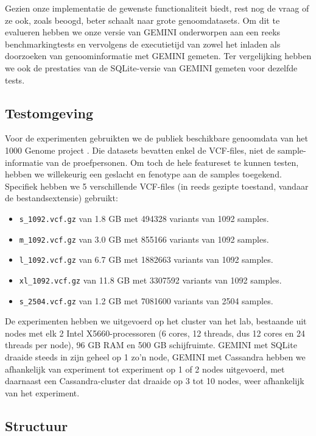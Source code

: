 Gezien onze implementatie de gewenste functionaliteit biedt, rest nog de vraag of ze ook, zoals beoogd, beter schaalt naar grote genoomdatasets. Om dit te evalueren hebben we onze versie van GEMINI onderworpen aan een reeks benchmarkingtests en vervolgens de executietijd van zowel het inladen als doorzoeken van genoominformatie met GEMINI gemeten. Ter vergelijking hebben we ook de prestaties van de SQLite-versie van GEMINI gemeten voor dezelfde tests.

\subsection{Testomgeving}

Voor de experimenten gebruikten we de publiek beschikbare genoomdata van het 1000 Genome project \cite{10002012integrated}. Die datasets bevatten enkel de VCF-files, niet de sample-informatie van de proefpersonen. Om toch de hele featureset te kunnen testen, hebben we willekeurig een geslacht en fenotype aan de samples toegekend. Specifiek hebben we 5 verschillende VCF-files (in reeds gezipte toestand, vandaar de bestandsextensie) gebruikt:
\begin{itemize}
\item \texttt{s\_1092.vcf.gz} van 1.8 GB met 494328 variants van 1092 samples.
\item \texttt{m\_1092.vcf.gz} van 3.0 GB met 855166 variants van 1092 samples.
\item \texttt{l\_1092.vcf.gz} van 6.7 GB met 1882663 variants van 1092 samples.
\item \texttt{xl\_1092.vcf.gz} van 11.8 GB met 3307592 variants van 1092 samples.
\item \texttt{s\_2504.vcf.gz} van 1.2 GB met 7081600 variants van 2504 samples.
\end{itemize}

De experimenten hebben we uitgevoerd op het cluster van het lab, bestaande uit nodes met elk 2 Intel X5660-processoren (6 cores, 12 threads, dus 12 cores en 24 threads per node), 96 GB RAM en 500 GB schijfruimte. GEMINI met SQLite draaide steeds in zijn geheel op 1 zo'n node, GEMINI met Cassandra hebben we afhankelijk van experiment tot experiment op 1 of 2 nodes uitgevoerd, met daarnaast een Cassandra-cluster dat draaide op 3 tot 10 nodes, weer afhankelijk van het experiment.

\subsection*{Structuur}

